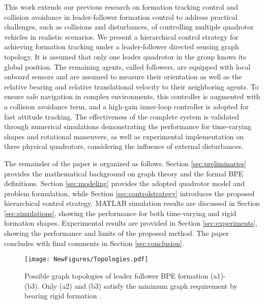 This work extends our previous research on formation tracking control \cite{tang2021formation} and collision avoidance in leader-follower formation control \cite{collision} to address practical challenges, such as collisions and disturbances, of controlling multiple quadrotor vehicles in realistic scenarios. We present a hierarchical control strategy for achieving formation tracking under a leader-follower directed sensing graph topology. It is assumed that only one leader quadrotor in the group knows its global position. The remaining agents, called followers, are equipped with local onboard sensors and are assumed to measure their orientation as well as the relative bearing and relative translational velocity to their neighboring agents. To ensure safe navigation in complex environments, this controller is augmented with a collision avoidance term, and a high-gain inner-loop controller is adopted for fast attitude tracking. The effectiveness of the complete system is validated through numerical simulations demonstrating the performance for time-varying shapes and rotational maneuvers, as well as experimental implementation on three physical quadrotors, considering the influence of external disturbances.

The remainder of the paper is organized as follows.
Section \ref{sec:preliminaries} provides the mathematical background on graph theory and the formal BPE definitions.
Section \ref{sec:modeling} provides the adopted quadrotor model and problem formulation, while Section \ref{sec:controlstrategy} introduces the proposed hierarchical control strategy. MATLAB simulation results are discussed in Section \ref{sec:simulations}, showing the performance for both time-varying and rigid formation shapes. Experimental results are provided in Section \ref{sec:experiments}, showing the performance and limits of the proposed method. The paper concludes with final comments in Section \ref{sec:conclusion}.
\begin{figure}
	\centering
        \vspace{0.2cm}
	\texttt{[image: NewFigures/Topologies.pdf]}
	\caption{Possible graph topologies of leader follower BPE formation (a1)-(b3). Only (a2) and (b3) satisfy the minimum graph requirement by bearing rigid formation \cite{trinh2018bearing}.}
	\label{fig:BPE}
\end{figure}
